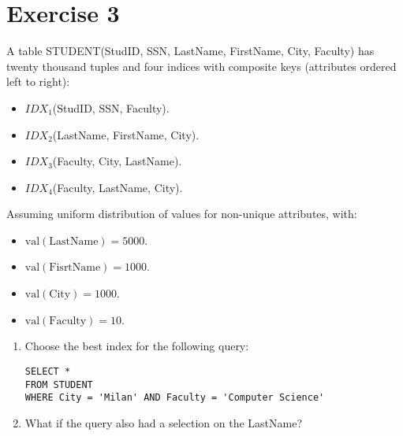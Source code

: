 \section{Exercise 3}

A table STUDENT(StudID, SSN, LastName, FirstName, City, Faculty) has twenty thousand tuples and four indices with composite keys (attributes ordered left to right):
\begin{itemize}
    \item $IDX_1$(StudID, SSN, Faculty).
    \item $IDX_2$(LastName, FirstName, City).
    \item $IDX_3$(Faculty, City, LastName).
    \item $IDX_4$(Faculty, LastName, City).
\end{itemize}
Assuming uniform distribution of values for non-unique attributes, with:
\begin{itemize}
    \item $\text{val}(\text{LastName}) = 5000$.
    \item $\text{val}(\text{FisrtName}) = 1000$.
    \item $\text{val}(\text{City}) = 1000$.
    \item $\text{val}(\text{Faculty}) = 10$.
\end{itemize}
\begin{enumerate}
    \item Choose the best index for the following query:
        \begin{lstlisting}[style=SQL]
SELECT * 
FROM STUDENT
WHERE City = 'Milan' AND Faculty = 'Computer Science'
        \end{lstlisting}
    \item What if the query also had a selection on the LastName?
\end{enumerate}

